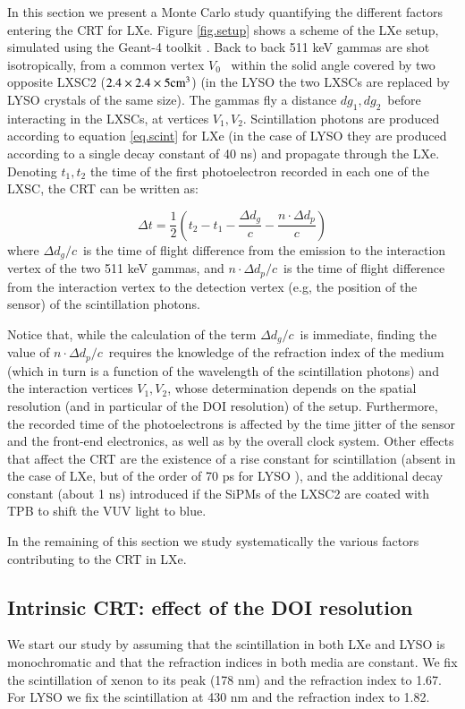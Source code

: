 \documentclass[review]{elsarticle}
\begin{document}
In this section we present a Monte Carlo study quantifying the different factors entering the CRT for LXe. Figure \ref{fig.setup} shows a scheme of  the LXe setup, simulated using the Geant-4 toolkit \cite{Agostinelli:2002hh} . Back to back 511 keV gammas are shot isotropically, from a common vertex $V_0$~ within the solid angle covered by two opposite LXSC2 ($2.4 \times 2.4 \times 5 {\rm cm^3}$) (in the LYSO the two LXSCs are replaced by LYSO crystals of the same size). The gammas fly a distance $dg_1, dg_2$~before interacting in the LXSCs, at vertices $V_1, V_2$. Scintillation photons are produced according to equation \ref{eq.scint} for LXe (in the case of LYSO they are produced according to a single decay constant of 40 ns) and propagate through the LXe. Denoting $t_1,t_2$ the time of the first photoelectron recorded in each one of the LXSC, the CRT can be written as:

\begin{equation}
\Delta t = \frac{1}{2}(t_2 - t_1 - \frac{\Delta d_g}{c} - \frac{n \cdot \Delta d_p}{c}) 
\label{eq.CRT}
\end{equation}
%
where $\Delta d_g/c$~is the time of flight difference from the emission to the interaction vertex of the two 511 keV gammas, and $n \cdot \Delta d_p/c$~is the time of flight difference from the interaction vertex to the
detection vertex (e.g, the position of the sensor) of the scintillation photons. 

Notice that, while the calculation of the term $\Delta d_g/c$~is immediate, finding the value
of $n \cdot \Delta d_p/c$~requires the knowledge of the refraction index of the medium (which in turn is a function of the wavelength of the scintillation photons) and the interaction vertices $V_1,V_2$, whose determination depends on the spatial resolution (and in particular of the DOI resolution) of the setup. Furthermore, the recorded time of the photoelectrons is affected by the time jitter of the sensor and the front-end electronics, as well as by the overall clock system. Other effects that affect the CRT are the existence of a rise constant for scintillation (absent in the case of LXe, but of the order of 70 ps for LYSO \cite{Seifert}), and the additional decay constant (about 1 ns) introduced if the SiPMs of the LXSC2 are coated with TPB to shift the VUV light to blue. 

In the remaining of this section we study systematically the various factors contributing to the CRT in LXe. 

\subsection*{Intrinsic CRT: effect of the DOI resolution}
We start our study by assuming that the scintillation in both LXe and LYSO is monochromatic and that the refraction indices in both media are constant. We fix the scintillation of xenon to its peak (178 nm) and
the refraction index to 1.67. For LYSO we fix the scintillation at 430 nm and the refraction index to 1.82. 
\end{document}
